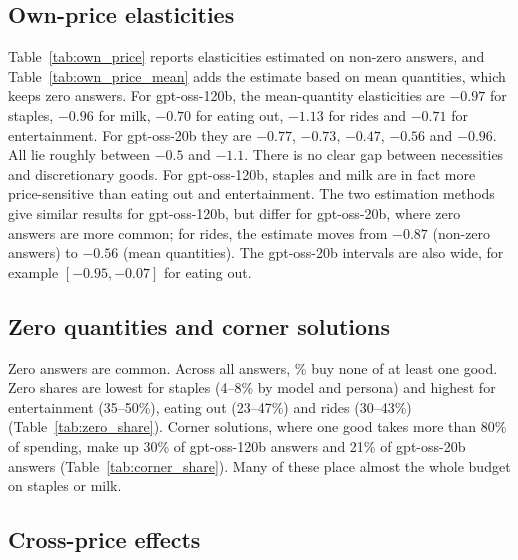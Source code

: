 \subsection{Own-price elasticities}
Table~\ref{tab:own_price} reports elasticities estimated on non-zero answers, and Table~\ref{tab:own_price_mean} adds the estimate based on mean quantities, which keeps zero answers. For gpt-oss-120b, the mean-quantity elasticities are $-0.97$ for staples, $-0.96$ for milk, $-0.70$ for eating out, $-1.13$ for rides and $-0.71$ for entertainment. For gpt-oss-20b they are $-0.77$, $-0.73$, $-0.47$, $-0.56$ and $-0.96$. All lie roughly between $-0.5$ and $-1.1$. There is no clear gap between necessities and discretionary goods. For gpt-oss-120b, staples and milk are in fact more price-sensitive than eating out and entertainment. The two estimation methods give similar results for gpt-oss-120b, but differ for gpt-oss-20b, where zero answers are more common; for rides, the estimate moves from $-0.87$ (non-zero answers) to $-0.56$ (mean quantities). The gpt-oss-20b intervals are also wide, for example $[-0.95, -0.07]$ for eating out.

\subsection{Zero quantities and corner solutions}
Zero answers are common. Across all answers, \ZeroAnswerShare\% buy none of at least one good. Zero shares are lowest for staples (4--8\% by model and persona) and highest for entertainment (35--50\%), eating out (23--47\%) and rides (30--43\%) (Table~\ref{tab:zero_share}). Corner solutions, where one good takes more than 80\% of spending, make up 30\% of gpt-oss-120b answers and 21\% of gpt-oss-20b answers (Table~\ref{tab:corner_share}). Many of these place almost the whole budget on staples or milk.

\subsection{Cross-price effects}

